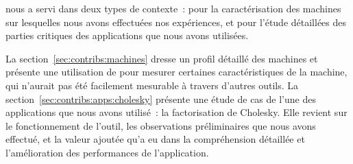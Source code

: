 \outil nous a servi dans deux types de contexte~: pour la caractérisation des machines sur lesquelles nous avons effectuées nos expériences, et pour l'étude détaillées des parties critiques des applications que nous avons utilisées.

La section~\ref{sec:contribs:machines} dresse un profil détaillé des machines et présente une utilisation de \outil pour mesurer certaines caractéristiques de la machine, qui n'aurait pas été facilement mesurable à travers d'autres outils.
La section~\ref{sec:contribs:apps:cholesky} présente une étude de cas de l'une des applications que nous avons utilisé~: la factorisation de Cholesky.
Elle revient sur le fonctionnement de l'outil, les observations préliminaires que nous avons effectué, et la valeur ajoutée qu'a eu \outil dans la compréhension détaillée et l'amélioration des performances de l'application.



